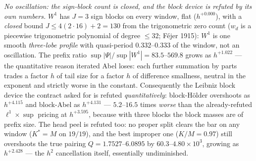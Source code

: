 \documentclass[11pt,a4paper]{article}
\begin{document}
\emph{No oscillation: the sign-block count is closed, and the block device is
refuted by its own numbers.} $W^1$ has $J=3$ sign blocks on every window, flat
($h^{+0.000}$), with a \emph{closed} bound $J\le4(2\cdot16)+2=130$ from the
trigonometric zero count ($w_d$ is a piecewise trigonometric polynomial of degree
$\le32$; F\'ejer 1915): $W^1$ is one smooth \emph{three-lobe profile} with
quasi-period $0.332$--$0.333$ of the window, not an oscillation. The prefix ratio
$\sup|\Psi|/\sup|W^1|=83.5$--$569.8$ grows as $h^{+1.022}$ --- the quantitative
reason iterated Abel loses: each further summation by parts trades a factor $h$
of tail size for a factor $h$ of difference smallness, neutral in the exponent
and strictly worse in the constant. Consequently the Leibniz block device the
contract asked for is refuted \emph{quantitatively}: block-H\"older overshoots as
$h^{+4.115}$ and block-Abel as $h^{+4.131}$ --- $5.2$--$16.5$ times \emph{worse}
than the already-refuted $\ell^1\times\sup$ pricing at $h^{+3.595}$, because with
three blocks the block masses are of prefix size. The head peel is refuted too:
no proper split clears the bar on any window ($K^*=M$ on $19/19$), and the best
improper one ($K/M=0.97$) still overshoots the true pairing $Q=1.7527$--$6.0895$
by $60.3$--$4.80\times10^{3}$, growing as $h^{+2.428}$ --- the $h^2$ cancellation
itself, essentially undiminished.
\end{document}
